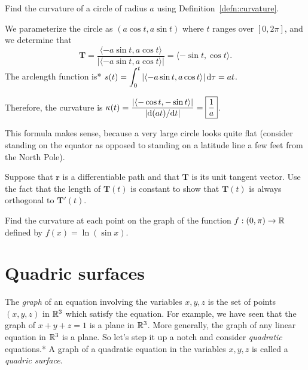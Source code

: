 \documentclass[prettycode,shellescape]{watsonbook}
\begin{document}
\begin{example}{}{}
  Find the curvature of a circle of radius $a$ using
  Definition~\ref{defn:curvature}. 
\end{example}

\begin{solution}
  We parameterize the circle as $(a \cos t, a \sin t)$ where $t$
  ranges over $[0,2\pi]$, and we determine that
  \[
    \mathbf{T} = \frac{\langle -a \sin t, a \cos t\rangle }{|\langle
      -a \sin t, a \cos t\rangle|} = \langle -\sin t, \cos t \rangle. 
  \]
  The arclength function is* $s(t) = \displaystyle{\int_0^t |\langle -a \sin t, a \cos
    t\rangle| \, \mathrm{d}\tau} = at$. 

  Therefore, the curvature is $\displaystyle{\kappa(t) = \frac{|\langle -\cos t, -\sin t
      \rangle|}{|\mathrm{d}(at)/\mathrm{d}t|} = \boxed{\frac{1}{a}}}$.

  This formula makes sense, because a very large circle looks quite flat
  (consider standing on the equator as opposed to standing on a
  latitude line a few feet from the North Pole).
\end{solution}

\begin{exercise}{}{}
  Suppose that $\mathbf{r}$ is a differentiable path and that
  $\mathbf{T}$ is its unit tangent vector. Use the fact that the
  length of $\mathbf{T}(t)$ is constant to show that $\mathbf{T}(t)$ is
  always orthogonal to $\mathbf{T}'(t)$.
\end{exercise}

\begin{exercise}{}{}
  Find the curvature at each point on the graph of the function
  $f:(0,\pi) \to \mathbb{R}$ defined by  $f(x) = \ln (\sin x)$. 
\end{exercise}

\section{Quadric surfaces} \label{sec:quadric_surfaces} 

The \textit{graph} of an equation involving the variables $x,y,z$ is
the set of points $(x,y,z)$ in $\mathbb{R}^3$ which satisfy the equation. For
example, we have seen that the graph of $x + y + z = 1$ is a plane in
$\mathbb{R}^3$. More generally, the graph of any linear equation in $\mathbb{R}^3$ is
a plane. So let's step it up a notch and consider \textit{quadratic}
equations.*  A graph of a quadratic
equation in the variables $x,y,z$ is called a \textit{quadric
  surface}. 
\end{document}
